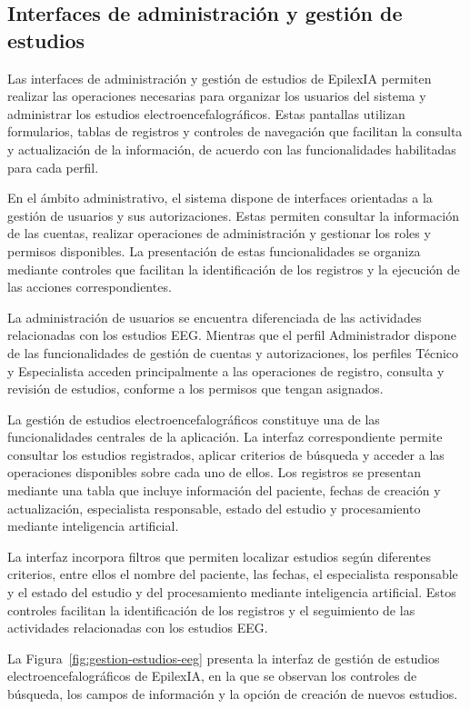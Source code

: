 \subsection{Interfaces de administración y gestión de estudios}

Las interfaces de administración y gestión de estudios de EpilexIA
permiten realizar las operaciones necesarias para organizar los
usuarios del sistema y administrar los estudios
electroencefalográficos. Estas pantallas utilizan formularios,
tablas de registros y controles de navegación que facilitan la
consulta y actualización de la información, de acuerdo con las
funcionalidades habilitadas para cada perfil.

En el ámbito administrativo, el sistema dispone de interfaces
orientadas a la gestión de usuarios y sus autorizaciones. Estas
permiten consultar la información de las cuentas, realizar
operaciones de administración y gestionar los roles y permisos
disponibles. La presentación de estas funcionalidades se organiza
mediante controles que facilitan la identificación de los registros
y la ejecución de las acciones correspondientes.

La administración de usuarios se encuentra diferenciada de las
actividades relacionadas con los estudios EEG. Mientras que el
perfil Administrador dispone de las funcionalidades de gestión de
cuentas y autorizaciones, los perfiles Técnico y Especialista
acceden principalmente a las operaciones de registro, consulta
y revisión de estudios, conforme a los permisos que tengan
asignados.

La gestión de estudios electroencefalográficos constituye una de
las funcionalidades centrales de la aplicación. La interfaz
correspondiente permite consultar los estudios registrados,
aplicar criterios de búsqueda y acceder a las operaciones
disponibles sobre cada uno de ellos. Los registros se presentan
mediante una tabla que incluye información del paciente, fechas
de creación y actualización, especialista responsable, estado
del estudio y procesamiento mediante inteligencia artificial.

La interfaz incorpora filtros que permiten localizar estudios
según diferentes criterios, entre ellos el nombre del paciente,
las fechas, el especialista responsable y el estado del estudio y del procesamiento mediante inteligencia artificial. Estos controles facilitan la identificación de
los registros y el seguimiento de las actividades relacionadas
con los estudios EEG.


La Figura~\ref{fig:gestion-estudios-eeg} presenta la interfaz
de gestión de estudios electroencefalográficos de EpilexIA,
en la que se observan los controles de búsqueda, los campos
de información y la opción de creación de nuevos estudios.


